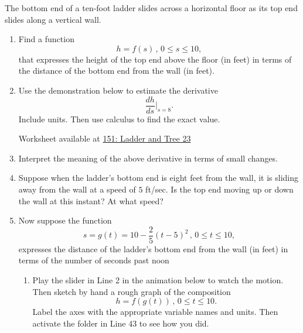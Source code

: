 \documentclass{ximera}
\begin{document}
\begin{question}  \label{QPERdgfret}
The bottom end of a ten-foot ladder slides across a horizontal floor as its top end slides along a vertical wall.

\begin{enumerate}
\item Find a function
\[
   h = f(s) \, , \, 0\leq s \leq 10 ,
\]
that expresses the height of the top end above the floor (in feet) in terms of the distance of the bottom end from the wall (in feet).

\item Use the demonstration below to estimate the derivative
\[
    \frac{dh}{ds}\Big|_{s=8}.
\]
Include units. Then use calculus to find the exact value.

\begin{onlineOnly}
    \begin{center}
\end{center}
\end{onlineOnly}

Worksheet available at \href{https://www.desmos.com/calculator/jqwsnh33o1}{151: Ladder and Tree 23} 

\item Interpret the meaning of the above derivative in terms of small changes.

\item Suppose when the ladder's bottom end is eight feet from the wall, it is sliding away from the wall at a speed of $5$ ft/sec. Is the top end moving up or down the wall at this instant? At what speed?

\item Now suppose the function
\[
    s = g(t)= 10-\frac{2}{5}(t-5)^2\, , \, 0\leq t \leq 10 ,
\]
expresses the distance of the ladder's bottom end from the wall (in feet) in terms of the number of seconds past noon

\begin{enumerate}
\item Play the slider in Line 2 in the animation below to watch the motion. Then sketch by hand a rough graph of the composition
\[
     h = f(g(t)) \, , \, 0\leq t \leq 10.
\]
Label the axes with the appropriate variable names and units. Then activate the folder in Line 43 to see how you did.

\begin{onlineOnly}
    \begin{center}
\end{center}
\end{onlineOnly}


\end{enumerate}
\end{enumerate}
\end{question}
\end{document}
